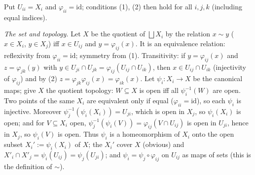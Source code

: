 \documentclass[11pt]{article}
\begin{document}
\pf
Put $U_{ii}=X_i$ and $\varphi_{ii}=\mathrm{id}$; conditions (1), (2) then hold for all $i,j,k$ (including equal indices).

\emph{The set and topology.} Let $X$ be the quotient of $\bigsqcup X_i$ by the relation $x\sim y$ ($x\in X_i$, $y\in X_j$) iff $x\in U_{ij}$ and $y=\varphi_{ij}(x)$. It is an equivalence relation: reflexivity from $\varphi_{ii}=\mathrm{id}$; symmetry from (1). Transitivity: if $y=\varphi_{ij}(x)$ and $z=\varphi_{jk}(y)$ with $y\in U_{ji}\cap U_{jk}=\varphi_{ij}(U_{ij}\cap U_{ik})$, then $x\in U_{ij}\cap U_{ik}$ (injectivity of $\varphi_{ij}$) and by (2) $z=\varphi_{jk}\varphi_{ij}(x)=\varphi_{ik}(x)$. Let $\psi_i:X_i\to X$ be the canonical maps; give $X$ the quotient topology: $W\subseteq X$ is open iff all $\psi_i^{-1}(W)$ are open. Two points of the same $X_i$ are equivalent only if equal ($\varphi_{ii}=\mathrm{id}$), so each $\psi_i$ is injective. Moreover $\psi_j^{-1}(\psi_i(X_i))=U_{ji}$, which is open in $X_j$, so $\psi_i(X_i)$ is open; and for $V\subseteq X_i$ open, $\psi_j^{-1}(\psi_i(V))=\varphi_{ij}(V\cap U_{ij})$ is open in $U_{ji}$, hence in $X_j$, so $\psi_i(V)$ is open. Thus $\psi_i$ is a homeomorphism of $X_i$ onto the open subset $X_i':=\psi_i(X_i)$ of $X$; the $X_i'$ cover $X$ (obvious) and $X'_i\cap X'_j=\psi_i(U_{ij})=\psi_j(U_{ji})$; and $\psi_i=\psi_j\circ\varphi_{ij}$ on $U_{ij}$ as maps of sets (this is the definition of $\sim$).
\end{document}
